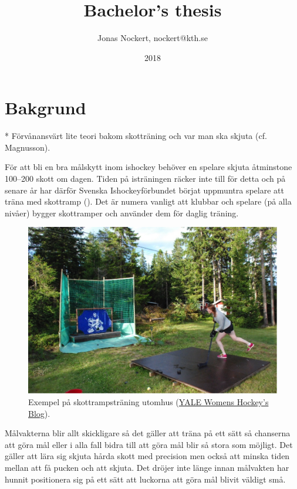 \documentclass[a4paper,12pt]{report}
\title{Bachelor's thesis}
\author{Jonas Nockert, nockert@kth.se}
\date{2018}
\begin{document}
\maketitle

\section{Bakgrund}


* Förvånansvärt lite teori bakom skotträning och var man ska skjuta (cf.
Magnusson).





För att bli en bra målskytt inom ishockey behöver en spelare skjuta åtminstone
100--200 skott om dagen. Tiden på isträningen räcker inte till för detta och
på senare år har därför Svenska Ishockeyförbundet börjat uppmuntra spelare
att träna med skottramp (\citep{Swehockey:2016}). Det är numera vanligt att
klubbar och spelare (på alla nivåer) bygger skottramper och använder dem
för daglig träning.

\begin{figure}[ht]
  \centering
  \includegraphics[width=\linewidth]{photos/the-incredible-shooting-ramp-my-mom-built-for-me.png}
  \caption{Exempel på skottrampsträning utomhus
  (\href{https://yalewomenshockey.wordpress.com/2013/07/18/ywih-summer-blog-hanna-astrom/}{YALE Womens Hockey's Blog}).
  \label{fig:skottramp}}
\end{figure}

Målvakterna blir allt skickligare så det gäller att träna på ett sätt
så chanserna att göra mål eller i alla fall bidra till att göra mål blir så
stora som möjligt. Det gäller att lära sig skjuta hårda skott med precision
men också att minska tiden mellan att få pucken och att skjuta. Det dröjer
inte länge innan målvakten har hunnit positionera sig på ett sätt att
luckorna att göra mål blivit väldigt små.
\end{document}
